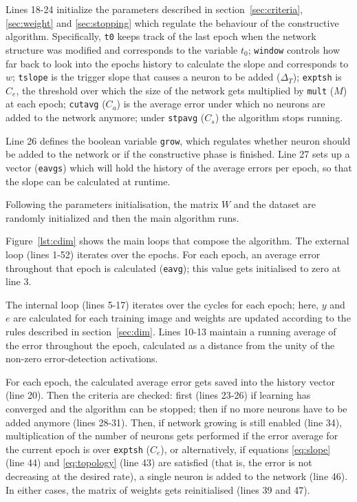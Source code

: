 \documentclass[11pt,a4paper]{report}
\begin{document}
				Lines 18-24 initialize the parameters described in section~\ref{sec:criteria}, \ref{sec:weight} and \ref{sec:stopping} which regulate the behaviour of the constructive algorithm. Specifically, \texttt{t0} keeps track of the last epoch when the network structure was modified and corresponds to the variable $t_0$; \texttt{window} controls how far back to look into the epochs history to calculate the slope and corresponds to $w$; \texttt{tslope} is the trigger slope that causes a neuron to be added ($\Delta_T$); \texttt{exptsh} is $C_e$, the threshold over which the size of the network gets multiplied by \texttt{mult} ($M$) at each epoch; \texttt{cutavg} ($C_a$) is the average error under which no neurons are added to the network anymore; under \texttt{stpavg} ($C_s$) the algorithm stops running.
				
				Line 26 defines the boolean variable \texttt{grow}, which regulates whether neuron should be added to the network or if the constructive phase is finished. Line 27 sets up a vector (\texttt{eavgs}) which will hold the history of the average errors per epoch, so that the slope can be calculated at runtime.

				Following the parameters initialisation, the matrix $W$ and the dataset are randomly initialized and then the main algorithm runs.
				
				Figure~\ref{lst:cdim} shows the main loops that compose the algorithm. The external loop (lines 1-52) iterates over the epochs. For each epoch, an average error throughout that epoch is calculated (\texttt{eavg}); this value gets initialised to zero at line 3.
				
				The internal loop (lines 5-17) iterates over the cycles for each epoch; here, $y$ and $e$ are calculated for each training image and weights are updated according to the rules described in section~\ref{sec:dim}. Lines 10-13 maintain a running average of the error throughout the epoch, calculated as a distance from the unity of the non-zero error-detection activations.
				
				For each epoch, the calculated average error gets saved into the history vector (line 20). Then the criteria are checked: first (lines 23-26) if learning has converged and the algorithm can be stopped; then if no more neurons have to be added anymore (lines 28-31). Then, if network growing is still enabled (line 34), multiplication of the number of neurons gets performed if the error average for the current epoch is over \texttt{exptsh} ($C_e$), or alternatively, if equations \ref{eq:slope} (line 44) and \ref{eq:topology} (line 43) are satisfied (that is, the error is not decreasing at the desired rate), a single neuron is added to the network (line 46). In either cases, the matrix of weights gets reinitialised (lines 39 and 47).
				
\end{document}
